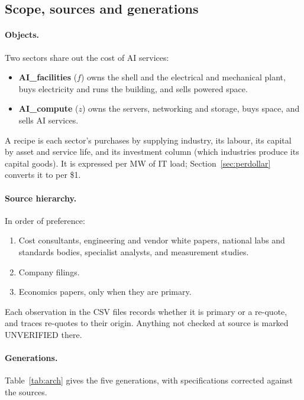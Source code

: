 \subsection{Scope, sources and generations}

\paragraph{Objects.} Two sectors share out the cost of AI services:
\begin{itemize}
  \item \textbf{AI\_facilities} ($f$) owns the shell and the electrical and mechanical plant,
    buys electricity and runs the building, and sells powered space.
  \item \textbf{AI\_compute} ($z$) owns the servers, networking and storage, buys space, and
    sells AI services.
\end{itemize}
A recipe is each sector's purchases by supplying industry, its labour, its capital by asset and
service life, and its investment column (which industries produce its capital goods). It is
expressed per MW of IT load; Section~\ref{sec:perdollar} converts it to per \$1.

\paragraph{Source hierarchy.} In order of preference:
\begin{enumerate}
  \item Cost consultants, engineering and vendor white papers, national labs and standards
    bodies, specialist analysts, and measurement studies.
  \item Company filings.
  \item Economics papers, only when they are primary.
\end{enumerate}
Each observation in the CSV files records whether it is primary or a re-quote, and traces
re-quotes to their origin. Anything not checked at source is marked UNVERIFIED there.

\paragraph{Generations.} Table~\ref{tab:arch} gives the five generations, with specifications
corrected against the sources.

